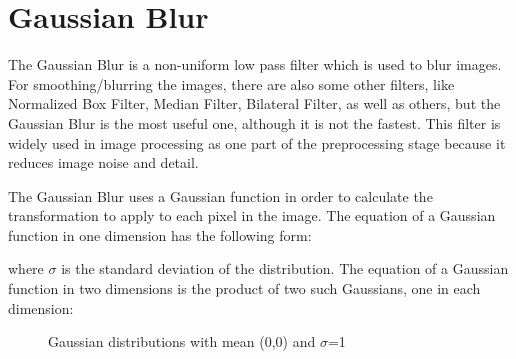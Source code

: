 %
\section{Gaussian Blur}\label{sec:Gaussian Blur}

The Gaussian Blur is a non-uniform low pass filter which is used to blur images. For smoothing/blurring the images, there are also some other filters, like Normalized Box Filter, Median Filter, Bilateral Filter, as well as others, but the Gaussian Blur is the most useful one, although it is not the fastest. This filter is widely used in image processing as one part of the preprocessing stage because it reduces image noise and detail.

The Gaussian Blur uses a Gaussian function in order to calculate the transformation to apply to each pixel in the image. The equation of a Gaussian function in one dimension has the following form: 

 \begin{center}
\end{center}

where $ \sigma $ is the standard deviation of the distribution. The equation of a Gaussian function in two dimensions is the product of two such Gaussians, one in each dimension: 

 \begin{center}
\emph{\color{green}}
\end{center}



\begin{figure}[H]
  \centering
  \hfill
  \caption{Gaussian distributions with mean (0,0) and $\sigma$=1\cite{GaussianBlur}}
\end{figure} 



